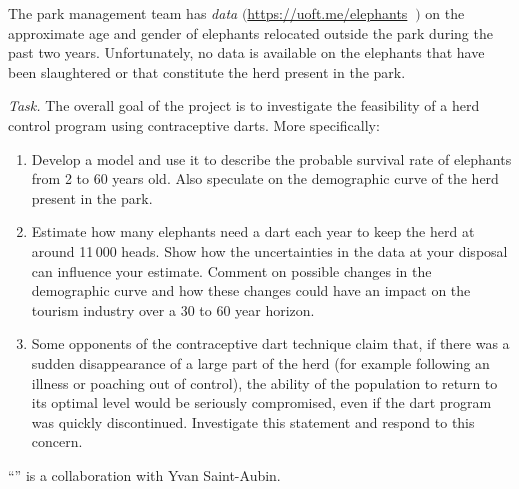 The park management team has \emph{data} $\bigg($\url{https://uoft.me/elephants}  $\ \bigg)$ on the approximate age and gender of elephants relocated outside the park during the past two years. 
Unfortunately, no data is available on the elephants that have been slaughtered or that constitute the herd present in the park. 

\emph{Task.} The overall goal of the project is to investigate the feasibility of a herd control program using contraceptive darts. 
More specifically:

\begin{enumerate}[label=\emph{\arabic*.}]
	\item Develop a model and use it to describe the probable survival rate of elephants from 2 to 60 years old. Also speculate on the demographic curve of the herd present in the park.

	\item Estimate how many elephants need a dart each year to keep the herd at around 11\,000 heads. Show how the uncertainties in the data at your disposal can influence your estimate. Comment on possible changes in the demographic curve and how these changes could have an impact on the tourism industry over a 30 to 60 year horizon.

	\item Some opponents of the contraceptive dart technique claim that, if there was a sudden disappearance of a large part of the herd (for example following an illness or poaching out of control), the ability of the population to return to its optimal level would be seriously compromised, even if the dart program was quickly discontinued. Investigate this statement and respond to this concern.

\end{enumerate}



%
%



\vfill

\begin{graybox}
\hfill ``\elephantstitle'' is a collaboration with Yvan Saint-Aubin.	
\end{graybox}


\begin{noexercises}
\end{noexercises}

